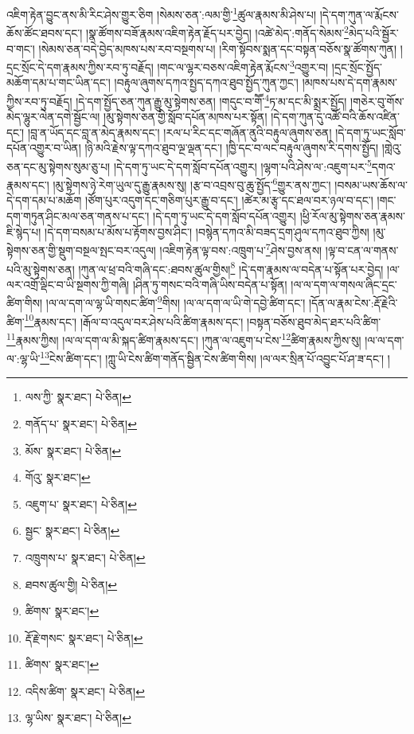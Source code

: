 འཇིག་རྟེན་བྱུང་ནས་མི་རིང་ཤེས་གྱུར་ཅིག །སེམས་ཅན་:ལམ་གྱི་\footnote{ལས་ཀྱི་  སྣར་ཐང་།  པེ་ཅིན། }ཚུལ་རྣམས་མི་ཤེས་པ། །དེ་དག་ཀུན་ལ་རྨོངས་ཆོས་ཚོང་ཐབས་དང་། །སྣ་ཚོགས་བཟོ་རྣམས་འཇིག་རྟེན་རྗོད་པར་བྱེད། །འཚེ་མེད་:གནོད་སེམས་\footnote{གནོད་པ་  སྣར་ཐང་།  པེ་ཅིན། }མེད་པའི་སྦྱོར་བ་གང་། །སེམས་ཅན་བདེ་བྱེད་མཁས་པས་རབ་བསྔགས་པ། །རིག་སྟོབས་སྨན་དང་བསྟན་བཅོས་སྣ་ཚོགས་ཀུན། །དྲང་སྲོང་དེ་དག་རྣམས་ཀྱིས་རབ་ཏུ་བརྗོད། །གང་ལ་ལྷར་བཅས་འཇིག་རྟེན་རྨོངས་\footnote{མོས་  སྣར་ཐང་།  པེ་ཅིན། }འགྱུར་བ། །དྲང་སྲོང་སྤྱོད་མཆོག་དམ་པ་གང་ཡིན་དང་། །བརྟུལ་ཞུགས་དཀའ་སྤྱད་དཀའ་ཐུབ་སྤྱོད་ཀུན་ཀྱང་། །མཁས་པས་དེ་དག་རྣམས་ཀྱིས་རབ་ཏུ་བརྗོད། །དེ་དག་སྤྱོད་ཅན་ཀུན་རྒྱུ་མུ་སྟེགས་ཅན། །གདུང་བ་གཽ་\footnote{གོའུ་  སྣར་ཐང་། }ཏ་མ་དང་མི་སྨྲར་སྤྱོད། །གཅེར་བུ་གོས་མེད་ལྷུར་ལེན་དགེ་སྦྱོང་ལ། །མུ་སྟེགས་ཅན་གྱི་སློབ་དཔོན་མཁས་པར་སྟོན། །དེ་དག་ཀུན་དུ་འཚོ་བའི་ཆོས་འཛིན་དང་། །བླ་ན་ཡོད་དང་བླ་ན་མེད་རྣམས་དང་། །རལ་པ་རིང་དང་གཞོན་ནུའི་བརྟུལ་ཞུགས་ཅན། །དེ་དག་ཏུ་ཡང་སློབ་དཔོན་འགྱུར་བ་ཡིན། །ཉི་མའི་རྗེས་ལྟ་དཀའ་ཐུབ་ལྔ་ལྡན་དང་། །ཁྱི་དང་བ་ལང་བརྟུལ་ཞུགས་རི་དགས་སྤྱོད། །གླེའུ་ཅན་དང་མུ་སྟེགས་སུམ་ཅུ་པ། །དེ་དག་ཏུ་ཡང་དེ་དག་སློབ་དཔོན་འགྱུར། །ལྷག་པའི་ཤེས་ལ་:འཇུག་པར་\footnote{འཇུག་པ་  སྣར་ཐང་།  པེ་ཅིན། }དགའ་རྣམས་དང་། །མུ་སྟེགས་ཉེ་རེག་ཡུལ་དུ་རྒྱུ་རྣམས་སུ། །རྩ་བ་འབྲས་བུ་ཆུ་སྤྱོད་\footnote{སྦྱང་  སྣར་ཐང་།  པེ་ཅིན། }གྱུར་ནས་ཀྱང་། །བསམ་ཡས་ཆོས་ལ་དེ་དག་དམ་པ་མཆོག །ཙོག་པུར་འདུག་དང་གཅིག་པུར་རྒྱུ་བ་དང་། །ཚེར་མ་རྩྭ་དང་ཐལ་བར་ཉལ་བ་དང་། །གང་དག་གཏུན་ཤིང་མལ་ཅན་གནས་པ་དང་། །དེ་དག་ཏུ་ཡང་དེ་དག་སློབ་དཔོན་འགྱུར། །ཕྱི་རོལ་མུ་སྟེགས་ཅན་རྣམས་ཇི་སྙེད་པ། །དེ་དག་བསམ་པ་མོས་པ་རྟོགས་བྱས་ཤིང་། །བསྙེན་དཀའ་མི་བཟད་དྲག་ཤུལ་དཀའ་ཐུབ་ཀྱིས། །མུ་སྟེགས་ཅན་གྱི་སྡུག་བསྔལ་སྤང་བར་འདུལ། །འཇིག་རྟེན་ལྟ་བས་:འཁྲུག་པ་\footnote{འཁྲུགས་པ་  སྣར་ཐང་།  པེ་ཅིན། }ཤེས་བྱས་ནས། །ལྟ་བ་ངན་ལ་གནས་པའི་མུ་སྟེགས་ཅན། །ཀུན་ལ་ཕྲ་བའི་གཞི་དང་:ཐབས་ཚུལ་གྱིས།\footnote{ཐབས་ཚུལ་གྱི།  པེ་ཅིན། } །དེ་དག་རྣམས་ལ་བདེན་པ་སྟོན་པར་བྱེད། །ལ་ལར་འགྲོ་ལྡིང་བ་ཡི་སྔགས་ཀྱི་གཞི། །ཤིན་ཏུ་གསང་བའི་གཞི་ཡིས་བདེན་པ་སྟོན། །ལ་ལ་དག་ལ་གསལ་ཞིང་དྲང་ཚིག་གིས། །ལ་ལ་དག་ལ་ལྷ་ཡི་གསང་ཚིག་\footnote{ཚིགས་  སྣར་ཐང་། }གིས། །ལ་ལ་དག་ལ་ཡི་གེ་དབྱེ་ཚིག་དང་། །དོན་ལ་རྣམ་ངེས་:རྡོ་རྗེའི་ཚིག་\footnote{རྡོ་རྗེ་གསང་  སྣར་ཐང་།  པེ་ཅིན། }རྣམས་དང་། །རྒོལ་བ་འདུལ་བར་ཤེས་པའི་ཚིག་རྣམས་དང་། །བསྟན་བཅོས་ཐུབ་མེད་ཐར་པའི་ཚིག་\footnote{ཚིགས་  སྣར་ཐང་། }རྣམས་ཀྱིས། །ལ་ལ་དག་ལ་མི་སྐད་ཚིག་རྣམས་དང་། །ཀུན་ལ་འཇུག་པ་ངེས་\footnote{འདིས་ཚིག་  སྣར་ཐང་།  པེ་ཅིན། }ཚིག་རྣམས་ཀྱིས་སུ། །ལ་ལ་དག་ལ་:ལྷ་ཡི་\footnote{ལྷ་ཡིས་  སྣར་ཐང་།  པེ་ཅིན། }ངེས་ཚིག་དང་། །ཀླུ་ཡི་ངེས་ཚིག་གནོད་སྦྱིན་ངེས་ཚིག་གིས། །ལ་ལར་སྲིན་པོ་འབྱུང་པོ་ཤ་ཟ་དང་། །
